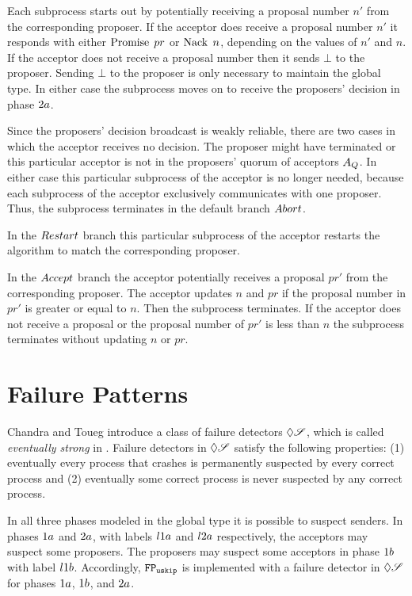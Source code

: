 Each subprocess starts out by potentially receiving a proposal number $n'$ from the corresponding proposer.
If the acceptor does receive a proposal number $n'$ it responds with either $\operatorname{Promise}\; pr$ or $\operatorname{Nack}\; n$, depending on the values of $n'$ and $n$.
If the acceptor does not receive a proposal number then it sends $\bot$ to the proposer.
Sending $\bot$ to the proposer is only necessary to maintain the global type.
In either case the subprocess moves on to receive the proposers' decision in phase $2a$.

Since the proposers' decision broadcast is weakly reliable, there are two cases in which the acceptor receives no decision.
The proposer might have terminated or this particular acceptor is not in the proposers' quorum of acceptors $A_Q$.
In either case this particular subprocess of the acceptor is no longer needed, because each subprocess of the acceptor exclusively communicates with one proposer.
Thus, the subprocess terminates in the default branch $\mathnormal{Abort}$.

In the $\mathnormal{Restart}$ branch this particular subprocess of the acceptor restarts the algorithm to match the corresponding proposer.

In the $\mathnormal{Accept}$ branch the acceptor potentially receives a proposal $pr'$ from the corresponding proposer.
The acceptor updates $n$ and $pr$ if the proposal number in $pr'$ is greater or equal to $n$.
Then the subprocess terminates.
If the acceptor does not receive a proposal or the proposal number of $pr'$ is less than $n$ the subprocess terminates without updating $n$ or $pr$.

\section{Failure Patterns}
Chandra and Toueg introduce a class of failure detectors $\Diamond\mathscr{S}$, which is called \emph{eventually strong} in \cite{ChandraToueg96}.
Failure detectors in $\Diamond\mathscr{S}$ satisfy the following properties: (1) eventually every process that crashes is permanently suspected by every correct process and (2) eventually some correct process is never suspected by any correct process.

In all three phases modeled in the global type it is possible to suspect senders.
In phases $1a$ and $2a$, with labels $l1a$ and $l2a$ respectively, the acceptors may suspect some proposers.
The proposers may suspect some acceptors in phase $1b$ with label $l1b$.
Accordingly, $\mathtt{FP_{uskip}}$ is implemented with a failure detector in $\Diamond\mathscr{S}$ for phases $1a$, $1b$, and $2a$.


